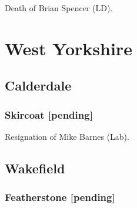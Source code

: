 \documentclass[a4paper,openany]{book}
\begin{document}
\begin{resultsiii}
Death of Brian Spencer (LD).

%
%

\section{West Yorkshire}

\subsection*{Calderdale}

\subsubsection*{Skircoat \hspace*{\fill}\nolinebreak[1]%
	\enspace\hspace*{\fill}
	[pending]}


Resignation of Mike Barnes (Lab).

\subsection*{Wakefield}

%
%
%

\subsubsection*{Featherstone \hspace*{\fill}\nolinebreak[1]%
	\enspace\hspace*{\fill}
	[pending]}


\end{resultsiii}
\end{document}
